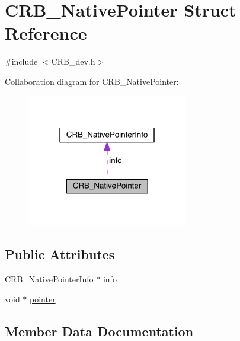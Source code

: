 \hypertarget{struct_c_r_b___native_pointer}{}\section{C\+R\+B\+\_\+\+Native\+Pointer Struct Reference}
\label{struct_c_r_b___native_pointer}


{\ttfamily \#include $<$C\+R\+B\+\_\+dev.\+h$>$}



Collaboration diagram for C\+R\+B\+\_\+\+Native\+Pointer\+:\nopagebreak
\begin{figure}[H]
\begin{center}
\leavevmode
\includegraphics[width=199pt]{struct_c_r_b___native_pointer__coll__graph}
\end{center}
\end{figure}
\subsection*{Public Attributes}
\begin{DoxyCompactItemize}
\item 
\hyperlink{struct_c_r_b___native_pointer_info}{C\+R\+B\+\_\+\+Native\+Pointer\+Info} $\ast$ \hyperlink{struct_c_r_b___native_pointer_af2aec2f2878e463a14f8c203f48a372e}{info}
\item 
void $\ast$ \hyperlink{struct_c_r_b___native_pointer_ad4bda48ee3efc0fc0c7b1a3bd6409903}{pointer}
\end{DoxyCompactItemize}


\subsection{Member Data Documentation}
\hypertarget{struct_c_r_b___native_pointer_af2aec2f2878e463a14f8c203f48a372e}{}
